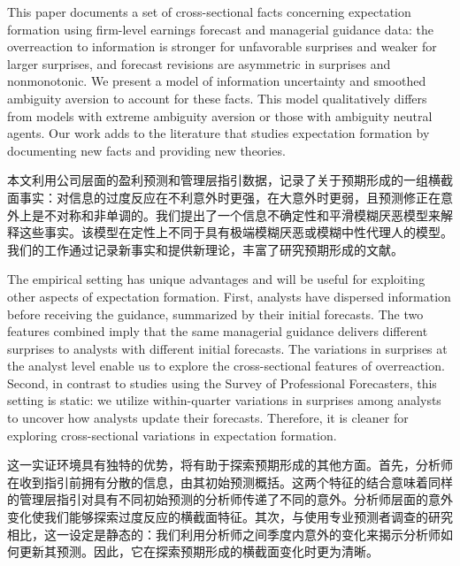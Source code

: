 \documentclass[12pt,a4paper]{article}
\newenvironment{original}
  {\par\medskip\noindent\ignorespaces}
  {\par\medskip}
\newenvironment{translation}
  {\par\noindent{\color{transblue}\ignorespaces}}
  {\par\bigskip}
\begin{document}
\begin{original}
This paper documents a set of cross-sectional facts concerning expectation formation using firm-level earnings forecast and managerial guidance data: the overreaction to information is stronger for unfavorable surprises and weaker for larger surprises, and forecast revisions are asymmetric in surprises and nonmonotonic. We present a model of information uncertainty and smoothed ambiguity aversion to account for these facts. This model qualitatively differs from models with extreme ambiguity aversion or those with ambiguity neutral agents. Our work adds to the literature that studies expectation formation by documenting new facts and providing new theories.
\end{original}
\begin{translation}
本文利用公司层面的盈利预测和管理层指引数据，记录了关于预期形成的一组横截面事实：对信息的过度反应在不利意外时更强，在大意外时更弱，且预测修正在意外上是不对称和非单调的。我们提出了一个信息不确定性和平滑模糊厌恶模型来解释这些事实。该模型在定性上不同于具有极端模糊厌恶或模糊中性代理人的模型。我们的工作通过记录新事实和提供新理论，丰富了研究预期形成的文献。
\end{translation}

\begin{original}
The empirical setting has unique advantages and will be useful for exploiting other aspects of expectation formation. First, analysts have dispersed information before receiving the guidance, summarized by their initial forecasts. The two features combined imply that the same managerial guidance delivers different surprises to analysts with different initial forecasts. The variations in surprises at the analyst level enable us to explore the cross-sectional features of overreaction. Second, in contrast to studies using the Survey of Professional Forecasters, this setting is static: we utilize within-quarter variations in surprises among analysts to uncover how analysts update their forecasts. Therefore, it is cleaner for exploring cross-sectional variations in expectation formation.
\end{original}
\begin{translation}
这一实证环境具有独特的优势，将有助于探索预期形成的其他方面。首先，分析师在收到指引前拥有分散的信息，由其初始预测概括。这两个特征的结合意味着同样的管理层指引对具有不同初始预测的分析师传递了不同的意外。分析师层面的意外变化使我们能够探索过度反应的横截面特征。其次，与使用专业预测者调查的研究相比，这一设定是静态的：我们利用分析师之间季度内意外的变化来揭示分析师如何更新其预测。因此，它在探索预期形成的横截面变化时更为清晰。
\end{translation}
\end{document}
